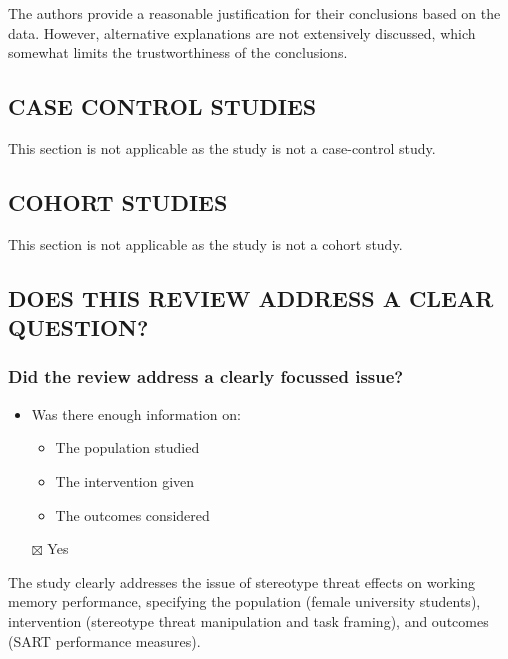 \documentclass[
  doc, a4paper]{apa7}
\providecommand{\tightlist}{%
  \setlength{\itemsep}{0pt}\setlength{\parskip}{0pt}}
\begin{document}
The authors provide a reasonable justification for their conclusions based on the data. However, alternative explanations are not extensively discussed, which somewhat limits the trustworthiness of the conclusions.

\subsection{\texorpdfstring{\textbf{CASE CONTROL STUDIES}}{CASE CONTROL STUDIES}}\label{case-control-studies}

This section is not applicable as the study is not a case-control study.

\subsection{\texorpdfstring{\textbf{COHORT STUDIES}}{COHORT STUDIES}}\label{cohort-studies}

This section is not applicable as the study is not a cohort study.

\subsection{DOES THIS REVIEW ADDRESS A CLEAR QUESTION?}\label{does-this-review-address-a-clear-question}

\subsubsection{Did the review address a clearly focussed issue?}\label{did-the-review-address-a-clearly-focussed-issue}

\begin{itemize}
\tightlist
\item
  Was there enough information on:

  \begin{itemize}
  \tightlist
  \item
    The population studied
  \item
    The intervention given
  \item
    The outcomes considered
  \end{itemize}
\item[$\boxtimes$]
  Yes
\end{itemize}

The study clearly addresses the issue of stereotype threat effects on working memory performance, specifying the population (female university students), intervention (stereotype threat manipulation and task framing), and outcomes (SART performance measures).
\end{document}
